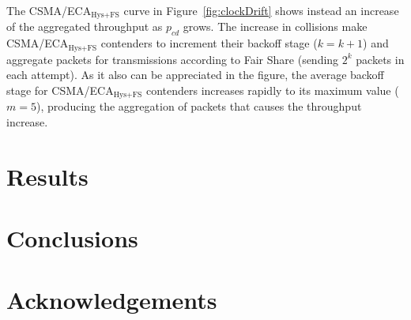 \documentclass[a4paper,journal]{IEEEtran}
\begin{document}
	The CSMA/ECA$_{\text{Hys+FS}}$ curve in Figure~\ref{fig:clockDrift} shows instead an increase of the aggregated throughput as $p_{cd}$ grows. The increase in collisions make CSMA/ECA$_{\text{Hys+FS}}$ contenders to increment their backoff stage ($k=k+1$) and aggregate packets for transmissions according to Fair Share (sending $2^{k}$ packets in each attempt). As it also can be appreciated in the figure, the average backoff stage for CSMA/ECA$_{\text{Hys+FS}}$ contenders increases rapidly to its maximum value ($m=5$), producing the aggregation of packets that causes the throughput increase.
	

\section{Results}\label{results}
\section{Conclusions}\label{conclusions}
\section{Acknowledgements}




\end{document}
